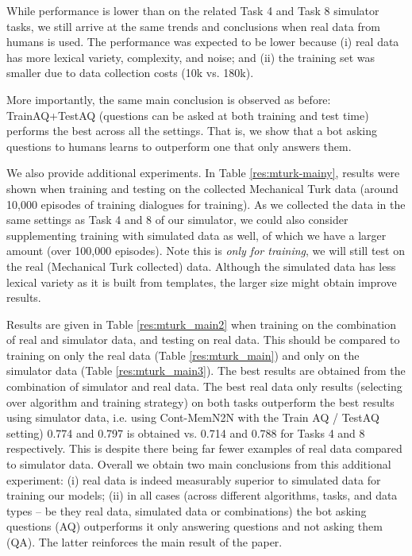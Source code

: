 While performance is lower than on the related Task 4 and Task 8 simulator tasks,
we still arrive at the same trends and conclusions when real data from humans is used.
The performance was expected to be lower because (i) real data has more lexical variety, complexity,
 and noise; and (ii) the training set was smaller due to data collection costs (10k vs. 180k).

More importantly, the same main conclusion is observed as before:
TrainAQ+TestAQ (questions can be asked at both training and test time) 
performs the best across all the settings. That is, we show that a bot asking questions to 
humans learns to outperform one that only answers them.


We also provide additional experiments.
In Table \ref{res:mturk-mainy}, results were shown when training and testing on the collected
Mechanical Turk data (around 10,000 episodes of training dialogues for training).
As we collected the data in the same settings as Task 4 and 8
of our simulator, we could also consider supplementing training with simulated 
data as well, of which we have a larger amount (over 100,000 episodes).
Note this is {\em only for training}, we will 
still test on the real (Mechanical Turk collected) data.
Although the simulated data has less lexical variety as it is built from templates, the 
larger size might obtain improve results. 

Results are given in Table \ref{res:mturk_main2} when training on the combination of real and simulator data,
and testing on real data. This should be compared to 
training on only the real data (Table \ref{res:mturk_main}) and only on the simulator
data (Table \ref{res:mturk_main3}).
The best results are obtained from the combination of simulator and real data. The best 
real data only results (selecting over algorithm and training strategy) on both tasks outperform
the best results using simulator data, i.e. 
using Cont-MemN2N with the Train AQ / TestAQ setting) 0.774 and 0.797 is obtained
 vs. 0.714 and 0.788 for Tasks 4 and 8 respectively.
This is despite there being far fewer examples of real data compared to simulator data.
Overall we obtain two main conclusions from this additional experiment:
(i) real data is indeed measurably superior to simulated data for training our models;
(ii) in all cases (across different algorithms, tasks, and data types -- be they real data, simulated data 
or combinations)
 the bot asking questions (AQ) outperforms it only answering questions and not asking them (QA).
The latter reinforces the main result of the paper.



